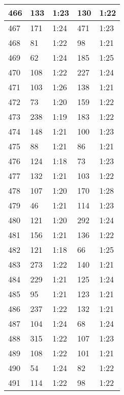 \begin{center}
\begin{longtable}{|p{2cm}|l|l|l|l|}
466	&   133           &  1:23  &		130     	& 1:22 \\ \hline
467	&   171           &  1:24  &		471     	& 1:23 \\ \hline
468	&   81            &  1:22  &		98      	& 1:21 \\ \hline
469	&   62            &  1:24  &		185     	& 1:25 \\ \hline
470	&   108           &  1:22  &		227     	& 1:24 \\ \hline
471	&   103           &  1:26  &		138     	& 1:21 \\ \hline
472	&   73            &  1:20  &		159     	& 1:22 \\ \hline
473	&   238           &  1:19  &		183     	& 1:22 \\ \hline
474	&   148           &  1:21  &		100     	& 1:23 \\ \hline
475	&   88            &  1:21  &		86      	& 1:21 \\ \hline
476	&   124           &  1:18  &		73      	& 1:23 \\ \hline
477	&   132           &  1:21  &		103     	& 1:22 \\ \hline
478	&   107           &  1:20  &		170     	& 1:28 \\ \hline
479	&   46            &  1:21  &		114     	& 1:23 \\ \hline
480	&   121           &  1:20  &		292     	& 1:24 \\ \hline
481	&   156           &  1:21  &		136     	& 1:22 \\ \hline
482	&   121           &  1:18  &		66      	& 1:25 \\ \hline
483	&   273           &  1:22  &		140     	& 1:21 \\ \hline
484	&   229           &  1:21  &		125     	& 1:24 \\ \hline
485	&   95            &  1:21  &		123     	& 1:21 \\ \hline
486	&   237           &  1:22  &		132     	& 1:21 \\ \hline
487	&   104           &  1:24  &		68      	& 1:24 \\ \hline
488	&   315           &  1:22  &		107     	& 1:23 \\ \hline
489	&   108           &  1:22  &		101     	& 1:21 \\ \hline
490	&   54            &  1:24  &		82      	& 1:22 \\ \hline
491	&   114           &  1:22  &		98      	& 1:22 \\ \hline

\end{longtable}
\end{center}
